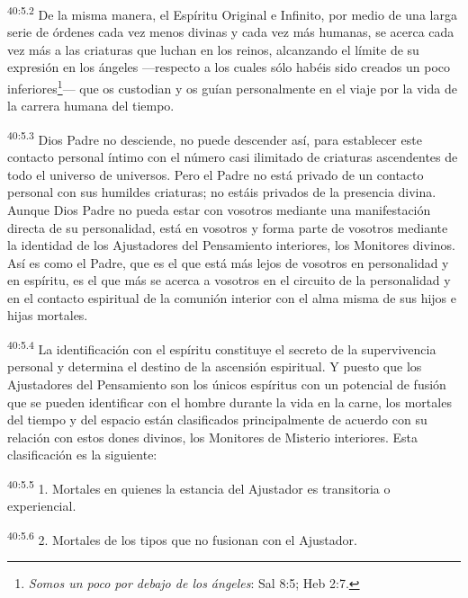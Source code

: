 \par
\textsuperscript{40:5.2} De la misma manera, el Espíritu Original e Infinito, por medio de una larga serie de órdenes cada vez menos divinas y cada vez más humanas, se acerca cada vez más a las criaturas que luchan en los reinos, alcanzando el límite de su expresión en los ángeles ---respecto a los cuales sólo habéis sido creados un poco inferiores\footnote{\textit{Somos un poco por debajo de los ángeles}: Sal 8:5; Heb 2:7.}--- que os custodian y os guían personalmente en el viaje por la vida de la carrera humana del tiempo.

\par
\textsuperscript{40:5.3} Dios Padre no desciende, no puede descender así, para establecer este contacto personal íntimo con el número casi ilimitado de criaturas ascendentes de todo el universo de universos. Pero el Padre no está privado de un contacto personal con sus humildes criaturas; no estáis privados de la presencia divina. Aunque Dios Padre no pueda estar con vosotros mediante una manifestación directa de su personalidad, está en vosotros y forma parte de vosotros mediante la identidad de los Ajustadores del Pensamiento interiores, los Monitores divinos. Así es como el Padre, que es el que está más lejos de vosotros en personalidad y en espíritu, es el que más se acerca a vosotros en el circuito de la personalidad y en el contacto espiritual de la comunión interior con el alma misma de sus hijos e hijas mortales.

\par
\textsuperscript{40:5.4} La identificación con el espíritu constituye el secreto de la supervivencia personal y determina el destino de la ascensión espiritual. Y puesto que los Ajustadores del Pensamiento son los únicos espíritus con un potencial de fusión que se pueden identificar con el hombre durante la vida en la carne, los mortales del tiempo y del espacio están clasificados principalmente de acuerdo con su relación con estos dones divinos, los Monitores de Misterio interiores. Esta clasificación es la siguiente:

\par
\textsuperscript{40:5.5} 1. Mortales en quienes la estancia del Ajustador es transitoria o experiencial.

\par
\textsuperscript{40:5.6} 2. Mortales de los tipos que no fusionan con el Ajustador.

